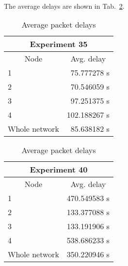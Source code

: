\documentclass[a4paper,oneside]{article}
\begin{document}
The average delays are shown in Tab.~\ref{tab:delay}.
\begin{table}[h]
  \centering
  \begin{subtable}{0.5\textwidth}
    \centering
    \begin{tabular}{lr}
      \multicolumn{2}{c}{Experiment 35} \\
      \hline
      \multicolumn{1}{c}{Node} & \multicolumn{1}{c}{Avg. delay} \\
      1 & 75.777278 s \\
      2 & 70.546059 s \\
      3 & 97.251375 s \\
      4 & 102.188267 s \\
      Whole network & 85.638182 s
    \end{tabular}
  \end{subtable}%
  \begin{subtable}{0.5\textwidth}
    \centering
    \begin{tabular}{lr}
      \multicolumn{2}{c}{Experiment 40} \\
      \hline
      \multicolumn{1}{c}{Node} & \multicolumn{1}{c}{Avg. delay} \\
      1 & 470.549583 s \\
      2 & 133.377088 s \\
      3 & 133.191906 s \\
      4 & 538.686233 s \\
      Whole network & 350.220946 s
    \end{tabular}
  \end{subtable}
  \caption{Average packet delays}
  \label{tab:delay}
\end{table}
\end{document}
